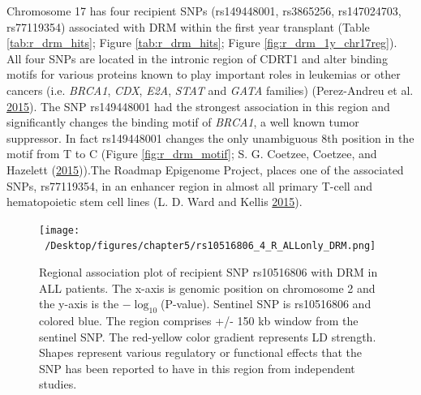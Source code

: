 \documentclass[]{DissertateOSU}
\begin{document}
Chromosome 17 has four recipient SNPs (rs149448001, rs3865256,
rs147024703, rs77119354) associated with DRM within the first year
transplant (Table \ref{tab:r_drm_hits}; Figure \ref{tab:r_drm_hits};
Figure \ref{fig:r_drm_1y_chr17reg}). All four SNPs are located in the
intronic region of CDRT1 and alter binding motifs for various proteins
known to play important roles in leukemias or other cancers (i.e.
\emph{BRCA1}, \emph{CDX}, \emph{E2A}, \emph{STAT} and \emph{GATA}
families) (Perez-Andreu et al.
\protect\hyperlink{ref-PerezAndreu_2015}{2015}). The SNP rs149448001 had
the strongest association in this region and significantly changes the
binding motif of \emph{BRCA1}, a well known tumor suppressor. In fact
rs149448001 changes the only unambiguous 8th position in the motif from
T to C (Figure \ref{fig:r_drm_motif}; S. G. Coetzee, Coetzee, and
Hazelett (\protect\hyperlink{ref-motifbreakr}{2015})).The Roadmap
Epigenome Project, places one of the associated SNPs, rs77119354, in an
enhancer region in almost all primary T-cell and hematopoietic stem cell
lines (L. D. Ward and Kellis \protect\hyperlink{ref-haploreg}{2015}).

\begin{figure}
    \centering
    \texttt{[image: ~/Desktop/figures/chapter5/rs10516806\_4\_R\_ALLonly\_DRM.png]}
    \caption[Regional association plot of recipient SNP rs10516806 with DRM in ALL patients.]{Regional association plot of recipient SNP rs10516806 with DRM in ALL patients. The x-axis is genomic position on chromosome 2 and the y-axis is the $-\log_{10}$(P-value). Sentinel SNP is rs10516806 and colored blue. The region comprises +/- 150 kb window from the sentinel SNP. The red-yellow color gradient represents LD strength. Shapes represent various regulatory or functional effects that the SNP has been reported to have in this region from independent studies.}
    \label{fig:r_drm_1y_chr4reg}  
\end{figure}
\end{document}
